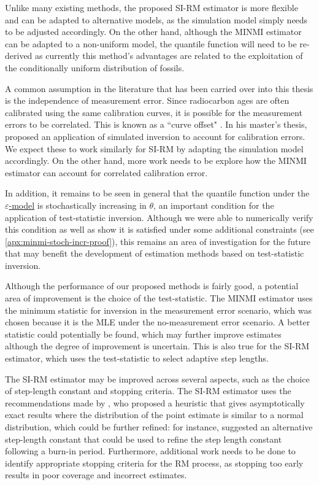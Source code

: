 Unlike many existing methods, the proposed SI-RM estimator is more flexible and can be adapted to alternative models, as the simulation model simply needs to be adjusted accordingly. On the other hand, although the MINMI estimator can be adapted to a non-uniform model, the quantile function will need to be re-derived as currently this method's advantages are related to the exploitation of the conditionally uniform distribution of fossils.

A common assumption in the literature that has been carried over into this thesis is the independence of measurement error. Since radiocarbon ages are often calibrated using the same calibration curves, it is possible for the measurement errors to be correlated. This is known as a ``curve offset" \cite{Ramsey2010}. In his master's thesis, \citet{King2020} proposed an application of simulated inversion to account for calibration errors. We expect these to work similarly for SI-RM by adapting the simulation model accordingly. On the other hand, more work needs to be explore how the MINMI estimator can account for correlated calibration error.

In addition, it remains to be seen in general that the quantile function under the \hyperref[model: measurement-error]{$\varepsilon$-model} is stochastically increasing in $\theta$, an important condition for the application of test-statistic inversion. Although we were able to numerically verify this condition as well as show it is satisfied under some additional constraints (see \autoref{apx:minmi-stoch-incr-proof}), this remains an area of investigation for the future that may benefit the development of estimation methods based on test-statistic inversion.

Although the performance of our proposed methods is fairly good, a potential area of improvement is the choice of the test-statistic. The MINMI estimator uses the minimum statistic for inversion in the measurement error scenario, which was chosen because it is the MLE under the no-measurement error scenario. A better statistic could potentially be found, which may further improve estimates although the degree of improvement is uncertain. This is also true for the SI-RM estimator, which uses the test-statistic to select adaptive step lengths.

The SI-RM estimator may be improved across several aspects, such as the choice of step-length constant and stopping criteria. The SI-RM estimator uses the recommendations made by \citet{Garthwaite1992}, who proposed a heuristic that gives asymptotically exact results where the distribution of the point estimate is similar to a normal distribution, which could be further refined: for instance, \citet{LlyodBotev2015} suggested an alternative step-length constant that could be used to refine the step length constant following a burn-in period. Furthermore, additional work needs to be done to identify appropriate stopping criteria for the RM process, as stopping too early results in poor coverage and incorrect estimates.

